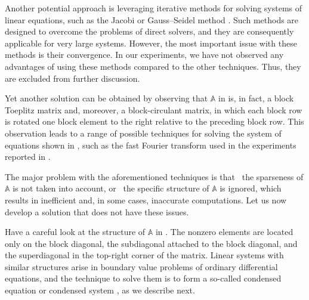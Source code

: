 Another potential approach is leveraging iterative methods for solving systems
of linear equations, such as the Jacobi or Gauss--Seidel method
\cite{press2007}. Such methods are designed to overcome the problems of direct
solvers, and they are consequently applicable for very large systems. However,
the most important issue with these methods is their convergence. In our
experiments, we have not observed any advantages of using these methods compared
to the other techniques. Thus, they are excluded from further discussion.

Yet another solution can be obtained by observing that $\mathbb{A}$ in
 is, in fact, a block Toeplitz matrix and, moreover,
a block-circulant matrix, in which each block row is rotated one block element
to the right relative to the preceding block row. This observation leads to a
range of possible techniques for solving the system of equations shown in
, such as the fast Fourier transform
\cite{mazancourt1983} used in the experiments reported in
.

The major problem with the aforementioned techniques is that \one~the sparseness
of $\mathbb{A}$ is not taken into account, or \two~the specific structure of
$\mathbb{A}$ is ignored, which results in inefficient and, in some cases,
inaccurate computations. Let us now develop a solution that does not have these
issues.

Have a careful look at the structure of $\mathbb{A}$ in
. The nonzero elements are located only on the block
diagonal, the subdiagonal attached to the block diagonal, and the superdiagonal
in the top-right corner of the matrix. Linear systems with similar structures
arise in boundary value problems of ordinary differential equations, and the
technique to solve them is to form a so-called condensed equation or condensed
system \cite{stoer2002}, as we describe next.

